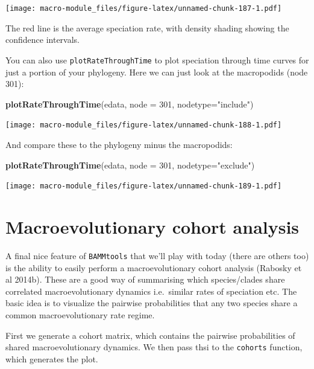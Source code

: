 \documentclass[]{book}
\newenvironment{Shaded}{\begin{snugshade}}{\end{snugshade}}
\newcommand{\KeywordTok}[1]{\textcolor[rgb]{0.13,0.29,0.53}{\textbf{{#1}}}}
\newcommand{\DataTypeTok}[1]{\textcolor[rgb]{0.13,0.29,0.53}{{#1}}}
\newcommand{\DecValTok}[1]{\textcolor[rgb]{0.00,0.00,0.81}{{#1}}}
\newcommand{\StringTok}[1]{\textcolor[rgb]{0.31,0.60,0.02}{{#1}}}
\newcommand{\NormalTok}[1]{{#1}}
\begin{document}
\texttt{[image: macro-module\_files/figure-latex/unnamed-chunk-187-1.pdf]}

The red line is the average speciation rate, with density shading
showing the confidence intervals.

You can also use \texttt{plotRateThroughTime} to plot speciation through
time curves for just a portion of your phylogeny. Here we can just look
at the macropodids (node 301):

\begin{Shaded}
\begin{Highlighting}[]
\KeywordTok{plotRateThroughTime}\NormalTok{(edata, }\DataTypeTok{node =} \DecValTok{301}\NormalTok{, }\DataTypeTok{nodetype=}\StringTok{"include"}\NormalTok{)}
\end{Highlighting}
\end{Shaded}

\texttt{[image: macro-module\_files/figure-latex/unnamed-chunk-188-1.pdf]}

And compare these to the phylogeny minus the macropodids:

\begin{Shaded}
\begin{Highlighting}[]
\KeywordTok{plotRateThroughTime}\NormalTok{(edata, }\DataTypeTok{node =} \DecValTok{301}\NormalTok{, }\DataTypeTok{nodetype=}\StringTok{"exclude"}\NormalTok{)}
\end{Highlighting}
\end{Shaded}

\texttt{[image: macro-module\_files/figure-latex/unnamed-chunk-189-1.pdf]}

\section{Macroevolutionary cohort
analysis}\label{macroevolutionary-cohort-analysis}

A final nice feature of \texttt{BAMMtools} that we'll play with today
(there are others too) is the ability to easily perform a
macroevolutionary cohort analysis (Rabosky et al 2014b). These are a
good way of summarising which species/clades share correlated
macroevolutionary dynamics i.e.~similar rates of speciation etc. The
basic idea is to visualize the pairwise probabilities that any two
species share a common macroevolutionary rate regime.

First we generate a cohort matrix, which contains the pairwise
probabilities of shared macroevolutionary dynamics. We then pass thsi to
the \texttt{cohorts} function, which generates the plot.
\end{document}
